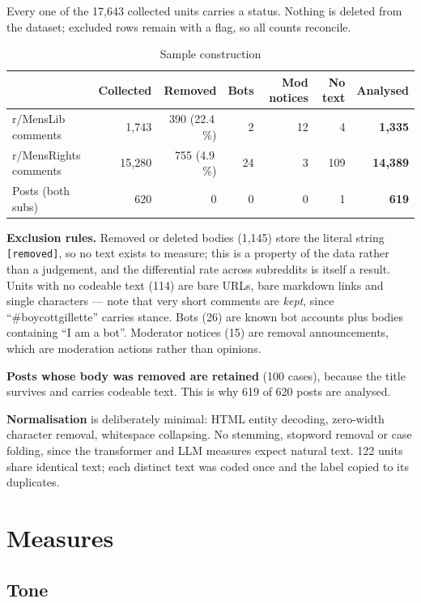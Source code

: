\documentclass[11pt,a4paper]{article}
\newcommand{\code}[1]{\texttt{\small #1}}
\begin{document}
Every one of the 17{,}643 collected units carries a status. Nothing is deleted from the dataset;
excluded rows remain with a flag, so all counts reconcile.

\begin{table}[h]
\centering\small
\caption{Sample construction}\label{tab:flow}
\begin{tabular}{lrrrrrr}
\toprule
& Collected & Removed & Bots & Mod notices & No text & \textbf{Analysed} \\
\midrule
r/MensLib comments    & 1{,}743  & 390 (22.4\,\%) & 2  & 12 & 4   & \textbf{1{,}335} \\
r/MensRights comments & 15{,}280 & 755 (4.9\,\%)  & 24 & 3  & 109 & \textbf{14{,}389} \\
Posts (both subs)     & 620      & 0              & 0  & 0  & 1   & \textbf{619} \\
\bottomrule
\end{tabular}
\end{table}

\textbf{Exclusion rules.} Removed or deleted bodies (1{,}145) store the literal string
\code{[removed]}, so no text exists to measure; this is a property of the data rather than a
judgement, and the differential rate across subreddits is itself a result. Units with no codeable
text (114) are bare URLs, bare markdown links and single characters --- note that very short
comments are \emph{kept}, since ``\#boycottgillette'' carries stance. Bots (26) are known bot
accounts plus bodies containing ``I am a bot''. Moderator notices (15) are removal announcements,
which are moderation actions rather than opinions.

\textbf{Posts whose body was removed are retained} (100 cases), because the title survives and
carries codeable text. This is why 619 of 620 posts are analysed.

\textbf{Normalisation} is deliberately minimal: HTML entity decoding, zero-width character removal,
whitespace collapsing. No stemming, stopword removal or case folding, since the transformer and LLM
measures expect natural text. 122 units share identical text; each distinct text was coded once and
the label copied to its duplicates.

\section{Measures}

\subsection{Tone}
\end{document}
